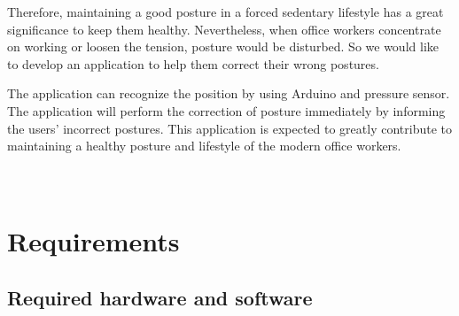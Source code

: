 \documentclass[conference]{IEEEtran}
\begin{document}
Therefore, maintaining a good posture in a forced sedentary lifestyle has a great significance to keep them healthy. Nevertheless, when office workers concentrate on working or loosen the tension, posture would be disturbed. So we would like to develop an application to help them correct their wrong postures.

The application can recognize the position by using Arduino and pressure sensor. The application will perform the correction of posture immediately by informing the users' incorrect postures. This application is expected to greatly contribute to maintaining a healthy posture and lifestyle of the modern office workers. 
\\\\\\

\section{Requirements}

\subsection{Required hardware and software}

%
%

\end{document}
